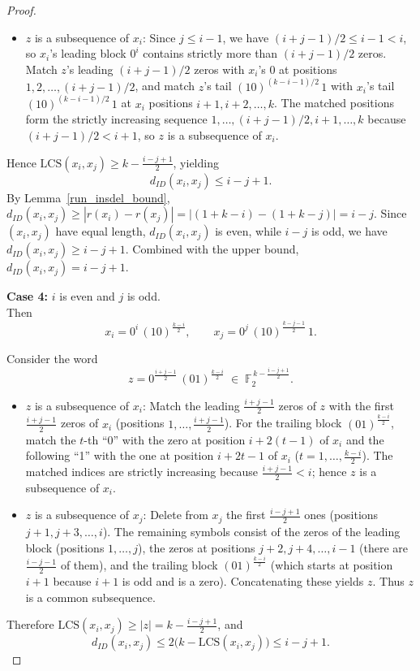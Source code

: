 \documentclass[10pt,a4paper]{amsart}
\begin{document}
\begin{proof}
\begin{itemize}
    
    \item {$z$ is a subsequence of $x_i$:}  
    Since $j \leq i - 1$, we have $(i+j-1)/2 \leq i - 1 < i$, so $x_i$'s leading block $0^{i}$ contains strictly more than $(i+j-1)/2$ zeros. Match $z$'s leading $(i+j-1)/2$ zeros with $x_i$'s 0 at positions $1, 2, \ldots, (i+j-1)/2$, and match $z$'s tail $(10)^{(k-i-1)/2}\,1$ with $x_i$'s tail $(10)^{(k-i-1)/2}\,1$ at $x_i$ positions $i+1, i+2, \ldots, k$. The matched positions form the strictly increasing sequence $1, \ldots, (i+j-1)/2, i+1, \ldots, k$ because $(i+j-1)/2 < i + 1$, so $z$ is a subsequence of $x_i$.
    \end{itemize}
    Hence $\mathrm{LCS}(x_i, x_j) \geq k - \frac{i-j+1}{2}$, yielding  
    \[
    d_{ID}(x_i, x_j)  \leq i - j + 1.
    \]  
    By Lemma~\ref{run_insdel_bound}, $d_{ID}(x_i,x_j)\ge |r(x_i)-r(x_j)| = |(1+k-i)-(1+k-j)| = i-j$. Since $(x_i,x_j)$ have equal length, $d_{ID}(x_i,x_j)$ is even, while $i-j$ is odd, we have $d_{ID}(x_i,x_j)\ge i-j+1$. Combined with the upper bound, $d_{ID}(x_i,x_j)=i-j+1$. 

    \smallskip

    \noindent \textbf{Case 4:} $i$ is even and $j$ is odd.\\
    
    Then
    \[
    x_i = 0^{i}\,(10)^{\frac{k-i}{2}}, \qquad 
    x_j = 0^{j}\,(10)^{\frac{k-j-1}{2}}\,1.
    \]

    
    Consider the word
    \[
    z = 0^{\frac{i+j-1}{2}}\,(01)^{\frac{k-i}{2}} \;\in\; \mathbb{F}_2^{\,k - \frac{i-j+1}{2}}.
    \]
    \begin{itemize}
    \item {$z$ is a subsequence of $x_i$:} 
    Match the leading $\frac{i+j-1}{2}$ zeros of $z$ with the first $\frac{i+j-1}{2}$ zeros of $x_i$ 
    (positions $1,\dots,\frac{i+j-1}{2}$). 
    For the trailing block $(01)^{\frac{k-i}{2}}$, match the $t$-th ``0'' with the zero at position 
    $i+2(t-1)$ of $x_i$ and the following ``1'' with the one at position $i+2t-1$ of $x_i$ 
    ($t=1,\dots,\frac{k-i}{2}$). 
    The matched indices are strictly increasing because $\frac{i+j-1}{2} < i$; hence $z$ is a subsequence of $x_i$.

    \item {$z$ is a subsequence of $x_j$:} 
    Delete from $x_j$ the first $\frac{i-j+1}{2}$ ones (positions $j+1, j+3, \dots, i$). 
    The remaining symbols consist of the zeros of the leading block (positions $1,\dots,j$), 
    the zeros at positions $j+2, j+4, \dots, i-1$ (there are $\frac{i-j-1}{2}$ of them), 
    and the trailing block $(01)^{\frac{k-i}{2}}$ (which starts at position $i+1$ because $i+1$ is odd and is a zero). 
    Concatenating these yields $z$. Thus $z$ is a common subsequence.
    \end{itemize}
    Therefore $\mathrm{LCS}(x_i,x_j) \ge |z| = k - \frac{i-j+1}{2}$, and
    \[
    d_{ID}(x_i,x_j) \le 2\bigl(k - \mathrm{LCS}(x_i,x_j)\bigr) \le i - j + 1.
    \]



\end{proof}
\end{document}
